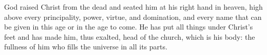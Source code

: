 \lettrine[lines=3]{G}{}od raised Christ from the dead and seated him at his right hand in heaven, high above every principality, power, virtue, and domination, and every name that can be given in this age or in the age to come. He has put all things under Christ’s feet and has made him, thus exalted, head of the church, which is his body: the fullness of him who fills the universe in all its parts.